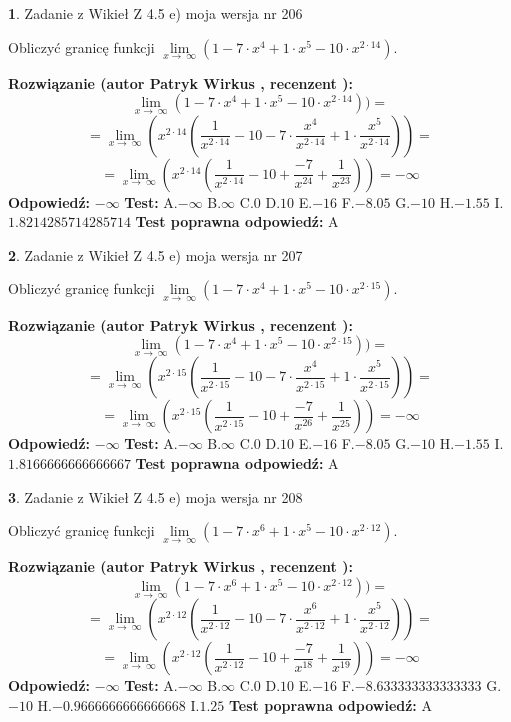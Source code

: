 \documentclass[12pt, a4paper]{article}
\theoremstyle{definition} %
\newtheorem{zad}{}
\newcommand{\zadStart}[1]{\begin{zad}#1\newline}
\newcommand{\zadStop}{\end{zad}}
\newcommand{\rozwStart}[2]{\noindent \textbf{Rozwiązanie (autor #1 , recenzent #2): }\newline}
\newcommand{\rozwStop}{\newline}
\newcommand{\odpStart}{\noindent \textbf{Odpowiedź:}\newline}
\newcommand{\odpStop}{\newline}
\newcommand{\testStart}{\noindent \textbf{Test:}\newline}
\newcommand{\testStop}{\newline}
\newcommand{\kluczStart}{\noindent \textbf{Test poprawna odpowiedź:}\newline}
\newcommand{\kluczStop}{\newline}
\begin{document}
\zadStart{Zadanie z Wikieł Z 4.5 e) moja wersja nr 206}


Obliczyć granicę funkcji  $\lim\limits_{x\to\ \infty}(1 - 7 \cdot x^{4}+1 \cdot x^{5}- 10 \cdot x^{2\cdot14})$.
\zadStop
\rozwStart{Patryk Wirkus}{}
$$\lim\limits_{x\to\ \infty}(1 - 7 \cdot x^{4}+1 \cdot x^{5}- 10 \cdot x^{2\cdot14}))=$$
$$=\lim\limits_{x\to\ \infty}(x^{2\cdot14}(\frac{1}{x^{2\cdot14}}-10 -7 \cdot \frac{x^{4}}{x^{2\cdot14}}+1 \cdot \frac{x^{5}}{x^{2\cdot14}}))=$$
$$=\lim\limits_{x\to\ \infty}(x^{2\cdot14}(\frac{1}{x^{2\cdot14}}-10 + \frac{-7}{x^{24}}+ \frac{1}{x^{23}}))=-\infty$$
\rozwStop
\odpStart
$-\infty$
\odpStop
\testStart
A.$-\infty$ B.$\infty$ C.$0$ D.$10$ E.$-16$
F.$-8.05$ G.$-10$
H.$-1.55$
I.$1.8214285714285714$
\testStop
\kluczStart
A
\kluczStop



\zadStart{Zadanie z Wikieł Z 4.5 e) moja wersja nr 207}


Obliczyć granicę funkcji  $\lim\limits_{x\to\ \infty}(1 - 7 \cdot x^{4}+1 \cdot x^{5}- 10 \cdot x^{2\cdot15})$.
\zadStop
\rozwStart{Patryk Wirkus}{}
$$\lim\limits_{x\to\ \infty}(1 - 7 \cdot x^{4}+1 \cdot x^{5}- 10 \cdot x^{2\cdot15}))=$$
$$=\lim\limits_{x\to\ \infty}(x^{2\cdot15}(\frac{1}{x^{2\cdot15}}-10 -7 \cdot \frac{x^{4}}{x^{2\cdot15}}+1 \cdot \frac{x^{5}}{x^{2\cdot15}}))=$$
$$=\lim\limits_{x\to\ \infty}(x^{2\cdot15}(\frac{1}{x^{2\cdot15}}-10 + \frac{-7}{x^{26}}+ \frac{1}{x^{25}}))=-\infty$$
\rozwStop
\odpStart
$-\infty$
\odpStop
\testStart
A.$-\infty$ B.$\infty$ C.$0$ D.$10$ E.$-16$
F.$-8.05$ G.$-10$
H.$-1.55$
I.$1.8166666666666667$
\testStop
\kluczStart
A
\kluczStop



\zadStart{Zadanie z Wikieł Z 4.5 e) moja wersja nr 208}


Obliczyć granicę funkcji  $\lim\limits_{x\to\ \infty}(1 - 7 \cdot x^{6}+1 \cdot x^{5}- 10 \cdot x^{2\cdot12})$.
\zadStop
\rozwStart{Patryk Wirkus}{}
$$\lim\limits_{x\to\ \infty}(1 - 7 \cdot x^{6}+1 \cdot x^{5}- 10 \cdot x^{2\cdot12}))=$$
$$=\lim\limits_{x\to\ \infty}(x^{2\cdot12}(\frac{1}{x^{2\cdot12}}-10 -7 \cdot \frac{x^{6}}{x^{2\cdot12}}+1 \cdot \frac{x^{5}}{x^{2\cdot12}}))=$$
$$=\lim\limits_{x\to\ \infty}(x^{2\cdot12}(\frac{1}{x^{2\cdot12}}-10 + \frac{-7}{x^{18}}+ \frac{1}{x^{19}}))=-\infty$$
\rozwStop
\odpStart
$-\infty$
\odpStop
\testStart
A.$-\infty$ B.$\infty$ C.$0$ D.$10$ E.$-16$
F.$-8.633333333333333$ G.$-10$
H.$-0.9666666666666668$
I.$1.25$
\testStop
\kluczStart
A
\kluczStop
\end{document}
